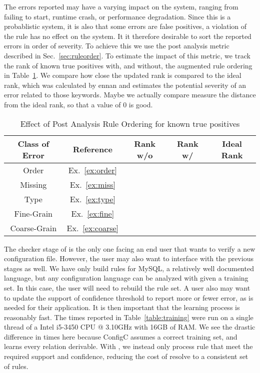 The errors reported may have a varying impact on the system, ranging from failing to start, runtime crash, or performance degradation.
Since this is a probablistic system, it is also that some errors are false positives, a violation of the rule has no effect on the system.
It it therefore desirable to sort the reported errors in order of severity. 
To achieve this we use the post analysis metric described in Sec.~\ref{sec:ruleorder}.
To estimate the impact of this metric, we track the rank of known true positives with, and without, the augmented rule ordering in Table~\ref{table:order}.
We compare how close the updated rank is compared to the ideal rank, which was calculated by ennan and estimates the potential severity of an error related to those keywords.
Maybe we actually compare measure the distance from the ideal rank, so that a value of 0 is good.

\begin{table}[h]
\centering
\caption{Effect of Post Analysis Rule Ordering for known true positives}
\label{table:order}
\setlength{\tabcolsep}{1em}
\begin{tabular}{|c|c|c|c|c|}
\hline
{\bf Class of Error} & {\bf Reference} & {\bf Rank w/o} & {\bf Rank w/} & {\bf Ideal Rank}\\
\hline
\hline
Order        & Ex.~\ref{ex:order}   & & \\ 
Missing      & Ex.~\ref{ex:miss}    & & \\ 
Type         & Ex.~\ref{ex:type}    & & \\ 
Fine-Grain   & Ex.~\ref{ex:fine}    & & \\ 
Coarse-Grain & Ex.~\ref{ex:coarse}  & & \\ 
\hline
\end{tabular}
\end{table}

The checker stage of \app is the only one facing an end user that wants to verify a new configuration file.
However, the user may also want to interface with the previous stages as well. 
We have only build rules for MySQL, a relatively well documented language, but any configuration language can be analyzed with \app given a training set.
In this case, the user will need to rebuild the rule set.
A user also may want to update the support of confidence threshold to report more or fewer error, as is needed for their application.
It is then important that the learning process is reasonably fast.
The times reported in Table~\ref{table:training} were run on a single thread of a Intel i5-3450 CPU @ 3.10GHz with 16GB of RAM.
We see the drastic difference in times here because ConfigC assumes a correct training set, and learns every relation derivable.
With \app, we instead only process rule that meet the required support and confidence, reducing the cost of resolve to a consistent set of rules.


